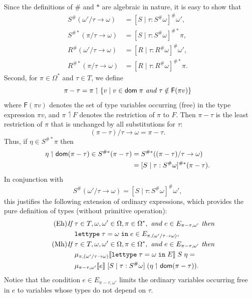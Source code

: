 \documentclass[sigplan,screen,nonacm,balance=false]{acmart}
\theoremstyle{plain}
\DeclarePairedDelimiter{\set}{\{}{\}}
\DeclarePairedDelimiter{\interp}{\llbracket}{\rrbracket}
\newcommand{\lettypein}[3]{\mathtt{lettype} \; #1 = #2 \; \mathtt{in} \; #3}
\newcommand{\dom}[1]{\mathsf{dom}\ifblank{#1}{\;}{#1}}
\newcommand{\FV}{\mathsf{F}}
\begin{document}
Since the definitions of $\#$ and $*$ are algebraic in nature, it is easy to show that
%
\begin{align*}
  S^\#(\omega'/\tau \to \omega) &= [S \mid \tau : S^\# \omega]^\# \omega', \\
  S^{\#*}(\pi/\tau \to \omega) &= [S \mid \tau : S^\# \omega]^{\#*} \pi, \\
  R^\#(\omega'/\tau \to \omega) &= [R \mid \tau : R^\# \omega]^\# \omega', \\
  R^{\#*}(\pi/\tau \to \omega) &= [R \mid \tau : R^\# \omega]^{\#*} \pi.
\end{align*}
%
Second, for $\pi \in \Omega^*$ and $\tau \in T$, we define
%
\begin{equation*}
  \pi - \tau = \pi \upharpoonleft \set{v \mid v \in \dom{} \pi \textit{ and } \tau \notin \FV(\pi v)}
\end{equation*}
%
where $\FV(\pi v)$ denotes the set of type variables occurring (free) in the type expression $\pi v$, and $\pi \upharpoonleft F$ denotes the restriction of $\pi$ to $F$.
Then $\pi - \tau$ is the least restriction of $\pi$ that is unchanged by all substitutions for $\tau$:
%
\begin{equation*}
  (\pi - \tau)/\tau \to \omega = \pi - \tau.
\end{equation*}
%
Thus, if $\eta \in S^{\#*} \pi$ then
%
\begin{align*}
  \eta \upharpoonleft \dom{(\pi - \tau)} \in S^{\#*}(\pi - \tau) &= S^{\#*}((\pi - \tau)/\tau \to \omega) \\
  &= [S \mid \tau : S^\# \omega]^{\#*} (\pi - \tau).
\end{align*}
%
In conjunction with
%
\begin{equation*}
  S^\#(\omega'/\tau \to \omega) = [S \mid \tau : S^\# \omega]^\# \omega',
\end{equation*}
%
this justifies the following extension of ordinary expressions, which provides the pure definition of types (without primitive operation):
%
\begin{align}
  \tag{Eh}
  \textit{If } & \tau \in T, \omega, \omega' \in \Omega, \pi \in \Omega^*, \textit{ and } e \in E_{\pi - \tau, \omega'} \textit{ then } \\
  \nonumber
  & \lettypein{\tau}{\omega}{e} \in E_{\pi, (\omega'/\tau \to \omega)}, \\
  \tag{Mh}
  \textit{If } & \tau \in T, \omega, \omega' \in \Omega, \pi \in \Omega^*, \textit{ and } e \in E_{\pi - \tau, \omega'} \textit{ then } \\
  \nonumber
  & \mu_{\pi, (\omega'/\tau \to \omega)} \interp{\lettypein{\tau}{\omega}{E}} \; S \; \eta = \\
  \nonumber
  & \mu_{\pi - \tau, \omega'} \interp{e} \; [S \mid \tau : S^\# \omega] \; (\eta \upharpoonleft \dom{(\pi - \tau)}).
\end{align}
%
Notice that the condition $e \in E_{\pi - \tau, \omega'}$ limits the ordinary variables occurring free in $e$ to variables whose types do not depend on $\tau$.
\end{document}
